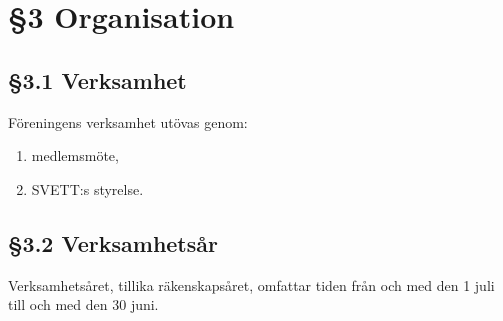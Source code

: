 \section*{\S3 Organisation}

\subsection*{\S3.1 Verksamhet}
{}

Föreningens verksamhet utövas genom:
\begin{enumerate}[label=\roman*)]
    \item medlemsmöte,
    \item SVETT:s styrelse.
\end{enumerate}

\subsection*{\S3.2 Verksamhetsår}

Verksamhetsåret, tillika räkenskapsåret, omfattar tiden från och med den 1 juli till
och med den 30 juni.
